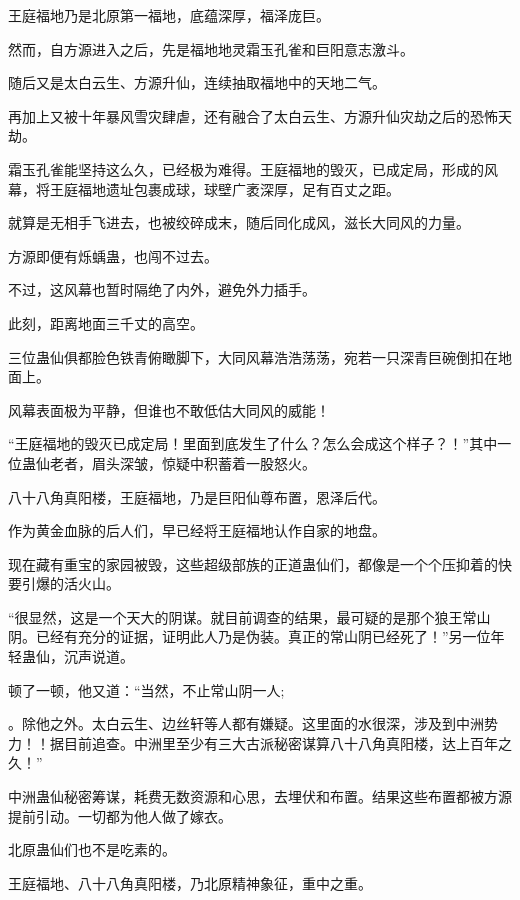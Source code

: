 
\begin{this_body}

王庭福地乃是北原第一福地，底蕴深厚，福泽庞巨。

然而，自方源进入之后，先是福地地灵霜玉孔雀和巨阳意志激斗。

随后又是太白云生、方源升仙，连续抽取福地中的天地二气。

再加上又被十年暴风雪灾肆虐，还有融合了太白云生、方源升仙灾劫之后的恐怖天劫。

霜玉孔雀能坚持这么久，已经极为难得。王庭福地的毁灭，已成定局，形成的风幕，将王庭福地遗址包裹成球，球壁广袤深厚，足有百丈之距。

就算是无相手飞进去，也被绞碎成末，随后同化成风，滋长大同风的力量。

方源即便有烁蝺蛊，也闯不过去。

不过，这风幕也暂时隔绝了内外，避免外力插手。

此刻，距离地面三千丈的高空。

三位蛊仙俱都脸色铁青俯瞰脚下，大同风幕浩浩荡荡，宛若一只深青巨碗倒扣在地面上。

风幕表面极为平静，但谁也不敢低估大同风的威能！

“王庭福地的毁灭已成定局！里面到底发生了什么？怎么会成这个样子？！”其中一位蛊仙老者，眉头深皱，惊疑中积蓄着一股怒火。

八十八角真阳楼，王庭福地，乃是巨阳仙尊布置，恩泽后代。

作为黄金血脉的后人们，早已经将王庭福地认作自家的地盘。

现在藏有重宝的家园被毁，这些超级部族的正道蛊仙们，都像是一个个压抑着的快要引爆的活火山。

“很显然，这是一个天大的阴谋。就目前调查的结果，最可疑的是那个狼王常山阴。已经有充分的证据，证明此人乃是伪装。真正的常山阴已经死了！”另一位年轻蛊仙，沉声说道。

顿了一顿，他又道：“当然，不止常山阴一人;

。除他之外。太白云生、边丝轩等人都有嫌疑。这里面的水很深，涉及到中洲势力！！据目前追查。中洲里至少有三大古派秘密谋算八十八角真阳楼，达上百年之久！”

中洲蛊仙秘密筹谋，耗费无数资源和心思，去埋伏和布置。结果这些布置都被方源提前引动。一切都为他人做了嫁衣。

北原蛊仙们也不是吃素的。

王庭福地、八十八角真阳楼，乃北原精神象征，重中之重。


\end{this_body}
